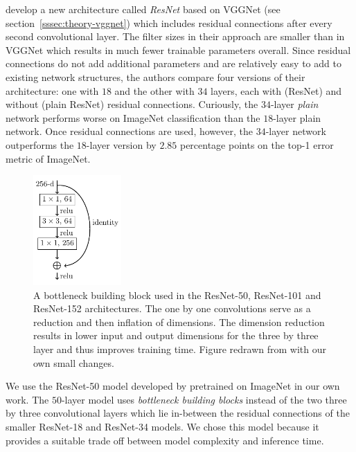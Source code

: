 \documentclass[final]{vutinfth} %
\begin{document}
\textcite{he2016} develop a new architecture called \emph{ResNet}
based on VGGNet (see section~\ref{sssec:theory-vggnet}) which includes
residual connections after every second convolutional layer. The
filter sizes in their approach are smaller than in VGGNet which
results in much fewer trainable parameters overall. Since residual
connections do not add additional parameters and are relatively easy
to add to existing network structures, the authors compare four
versions of their architecture: one with $18$ and the other with $34$
layers, each with (ResNet) and without (plain ResNet) residual
connections. Curiously, the $34$-layer \emph{plain} network performs
worse on ImageNet classification than the $18$-layer plain
network. Once residual connections are used, however, the $34$-layer
network outperforms the $18$-layer version by $2.85$ percentage points
on the top-1 error metric of ImageNet.

\begin{figure}
  \centering
  \includegraphics[width=0.3\textwidth]{graphics/bottleneck/bottleneck.pdf}
  \caption[Bottleneck building block]{A bottleneck building block used
    in the ResNet-50, ResNet-101 and ResNet-152 architectures. The one
    by one convolutions serve as a reduction and then inflation of
    dimensions. The dimension reduction results in lower input and
    output dimensions for the three by three layer and thus improves
    training time. Figure redrawn from \textcite{he2016} with our own
    small changes.}
  \label{fig:residual-connection}
\end{figure}

We use the ResNet-50 model developed by \textcite{he2016} pretrained
on ImageNet in our own work. The $50$-layer model uses
\emph{bottleneck building blocks} instead of the two three by three
convolutional layers which lie in-between the residual connections of
the smaller ResNet-18 and ResNet-34 models. We chose this model
because it provides a suitable trade off between model complexity and
inference time.
\end{document}

